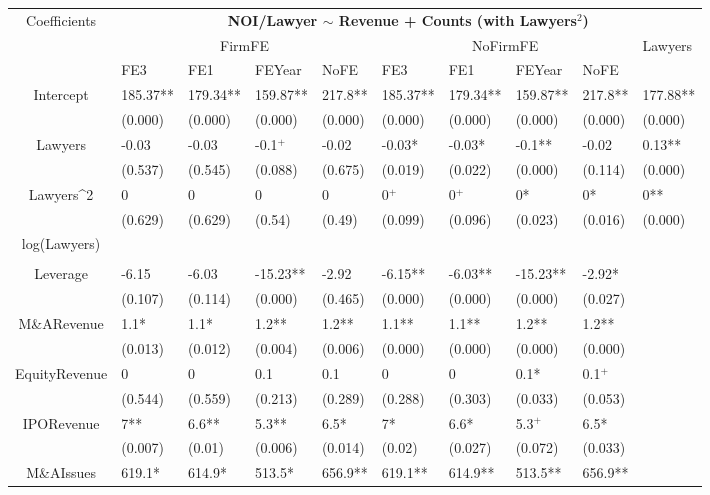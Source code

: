 \documentclass{article}
\begin{document}
\begin{table}[H]
\centering
\begin{tabular}{|clllllllll|}
\hline
\multirow{3}{*}{Coefficients} & \multicolumn{9}{c|}{\textbf{NOI/Lawyer $\sim$ Revenue + Counts (with Lawyers$^2$)}} \\
\cline{2-10}
& \multicolumn{4}{c}{FirmFE} & \multicolumn{4}{c}{NoFirmFE} & \multirow{2}{*}{Lawyers} \\
\cline{2-9}
& FE3 & FE1 & FEYear & NoFE & FE3 & FE1 & FEYear & NoFE &  \\
\hline
 
Intercept & 185.37** & 179.34** & 159.87** & 217.8** & 185.37** & 179.34** & 159.87** & 217.8** & 177.88** \\ 
   & (0.000) & (0.000) & (0.000) & (0.000) & (0.000) & (0.000) & (0.000) & (0.000) & (0.000) \\ 
  Lawyers & -0.03 & -0.03 & -0.1$^{+}$ & -0.02 & -0.03* & -0.03* & -0.1** & -0.02 & 0.13** \\ 
   & (0.537) & (0.545) & (0.088) & (0.675) & (0.019) & (0.022) & (0.000) & (0.114) & (0.000) \\ 
  Lawyers^2 & 0 & 0 & 0 & 0 & 0$^{+}$ & 0$^{+}$ & 0* & 0* & 0** \\ 
   & (0.629) & (0.629) & (0.54) & (0.49) & (0.099) & (0.096) & (0.023) & (0.016) & (0.000) \\ 
  log(Lawyers) &  &  &  &  &  &  &  &  &  \\ 
   &  &  &  &  &  &  &  &  &  \\ 
  Leverage & -6.15 & -6.03 & -15.23** & -2.92 & -6.15** & -6.03** & -15.23** & -2.92* &  \\ 
   & (0.107) & (0.114) & (0.000) & (0.465) & (0.000) & (0.000) & (0.000) & (0.027) &  \\ 
  M\&ARevenue & 1.1* & 1.1* & 1.2** & 1.2** & 1.1** & 1.1** & 1.2** & 1.2** &  \\ 
   & (0.013) & (0.012) & (0.004) & (0.006) & (0.000) & (0.000) & (0.000) & (0.000) &  \\ 
  EquityRevenue & 0 & 0 & 0.1 & 0.1 & 0 & 0 & 0.1* & 0.1$^{+}$ &  \\ 
   & (0.544) & (0.559) & (0.213) & (0.289) & (0.288) & (0.303) & (0.033) & (0.053) &  \\ 
  IPORevenue & 7** & 6.6** & 5.3** & 6.5* & 7* & 6.6* & 5.3$^{+}$ & 6.5* &  \\ 
   & (0.007) & (0.01) & (0.006) & (0.014) & (0.02) & (0.027) & (0.072) & (0.033) &  \\ 
  M\&AIssues & 619.1* & 614.9* & 513.5* & 656.9** & 619.1** & 614.9** & 513.5** & 656.9** &  \\ 

\end{tabular}
\end{table}
\end{document}
